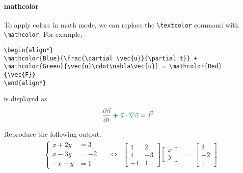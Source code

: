 \paragraph{mathcolor}
To apply colors in math mode, we can replace the \texttt{\textbackslash textcolor} command with \texttt{\textbackslash mathcolor}. For example,
\begin{lstlisting}
\begin{align*}
\mathcolor{Blue}{\frac{\partial \vec{u}}{\partial t}} + \mathcolor{Green}{\vec{u}\cdot\nabla\vec{u}} = \mathcolor{Red}{\vec{F}} 
\end{align*}
\end{lstlisting}
is displayed as
\begin{align*}
\mathcolor{Blue}{\frac{\partial \vec{u}}{\partial t}} + \mathcolor{Green}{\vec{u}\cdot\nabla\vec{u}} = \mathcolor{Red}{\vec{F}} 
\end{align*}

\begin{exercisebox}
\begin{Exercise}
Reproduce the following output.
\begin{align*}
&\left\{\begin{aligned}
x + 2y &= 3 \\
x - 3y &= -2 \\
-x + y &= 1
\end{aligned}\right.
& & \Leftrightarrow
&\begin{bmatrix}
1 & 2 \\
1 & -3 \\
-1 & 1
\end{bmatrix}
\begin{bmatrix}
x \\
y
\end{bmatrix}
&=
\begin{bmatrix}
3 \\
-2 \\
1
\end{bmatrix}
\end{align*}
\end{Exercise}
\end{exercisebox}